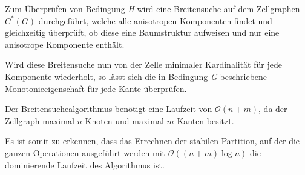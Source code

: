 Zum Überprüfen von Bedingung \emph{H} wird eine Breitensuche auf dem Zellgraphen $C^*(G)$ durchgeführt, welche alle anisotropen Komponenten findet und gleichzeitig überprüft, ob diese eine Baumstruktur aufweisen und nur eine anisotrope Komponente enthält.

Wird diese Breitensuche nun von der Zelle minimaler Kardinalität für jede Komponente wiederholt, so lässt sich die in Bedingung \emph{G} beschriebene Monotonieeigenschaft für jede Kante überprüfen.

Der Breitensuchealgorithmus benötigt eine Laufzeit von $\mathcal{O}(n+m)$, da der Zellgraph maximal $n$ Knoten und maximal $m$ Kanten besitzt.

Es ist somit zu erkennen, dass das Errechnen der stabilen Partition, auf der die ganzen Operationen ausgeführt werden mit $\mathcal{O}((n+m)\log n)$ die dominierende Laufzeit des Algorithmus ist.